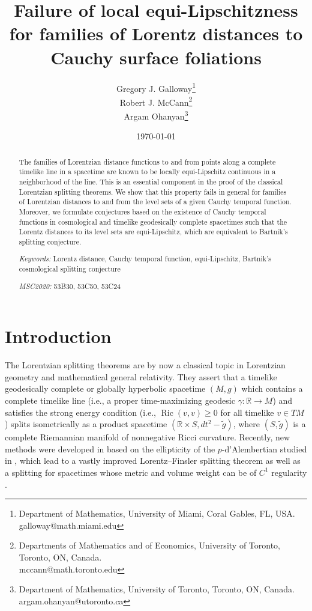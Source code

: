 \documentclass[a4paper,11pt]{article}
\title{Failure of local equi-Lipschitzness for families of Lorentz distances to Cauchy surface foliations}
\author{Gregory J. Galloway\footnote{Department of Mathematics, University of Miami, Coral Gables, FL, USA.\\galloway@math.miami.edu}\\Robert J. McCann\footnote{Departments of Mathematics and of Economics, University of Toronto, Toronto, ON, Canada.\\ mccann@math.toronto.edu}\\Argam Ohanyan\footnote{Department of Mathematics, University of Toronto, Toronto, ON, Canada.\\argam.ohanyan@utoronto.ca}}
\numberwithin{equation}{section}
\theoremstyle{definition}
\theoremstyle{plain}
\newcommand{\R}{\mathbb R}
\DeclareMathOperator{\Ric}{Ric}
\begin{document}
\date{\today}


\maketitle

\begin{abstract}
The families of Lorentzian distance functions to and from points along a complete timelike line in a spacetime are known to be locally equi-Lipschitz continuous in a neighborhood of the line. This is an essential component in the proof of the classical Lorentzian splitting theorems. We show that this property fails in general for families of Lorentzian distances to and from the level sets of a given Cauchy temporal function. Moreover, we formulate conjectures based on the existence of Cauchy temporal functions in cosmological and timelike geodesically complete spacetimes such that the Lorentz distances to its level sets are equi-Lipschitz, which are equivalent to Bartnik's splitting conjecture.
\vspace{1em}

\noindent
\emph{Keywords: } Lorentz distance, Cauchy temporal function, equi-Lipschitz, Bartnik's cosmological splitting conjecture
\medskip

\noindent
\emph{MSC2020:} 53B30, 53C50, 53C24

\end{abstract}
\tableofcontents

\section{Introduction}
\label{section: introduction}

The Lorentzian splitting theorems \cite{Eschenburg1988, Galloway1989, Newman1990} are by now a classical topic in Lorentzian geometry and mathematical general relativity. They assert that a timelike geodesically complete or globally hyperbolic spacetime $(M,g)$ which contains a complete timelike line (i.e., a proper time-maximizing geodesic $\gamma: \R \to M$) and satisfies the strong energy condition (i.e., $\Ric(v,v) \geq 0$ for all timelike $v \in TM$) splits isometrically as a product spacetime $(\R \times S, dt^2 - \tilde g)$, where $(S,\tilde g)$ is a complete Riemannian manifold of nonnegative Ricci curvature. Recently, new methods were developed in \cite{Quintetsmooth} based on the ellipticity of the $p$-d'Alembertian studied in \cite{octet}, which lead to a vastly improved Lorentz--Finsler splitting theorem \cite{caponio2024splitting} as well as a splitting for spacetimes whose metric and volume weight can be of $C^1$ regularity \cite{quintetnonsmooth}.
\end{document}
